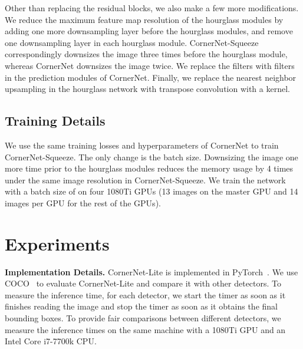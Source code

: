 \documentclass{bmvc2k}
\begin{document}
Other than replacing the residual blocks, we also make a few more modifications. We reduce the maximum feature map resolution of the hourglass modules by adding one more downsampling layer before the hourglass modules, and remove one downsampling layer in each hourglass module. CornerNet-Squeeze correspondingly downsizes the image three times before the hourglass module, whereas CornerNet downsizes the image twice. We replace the  filters with  filters in the prediction modules of CornerNet. Finally, we replace the nearest neighbor upsampling in the hourglass network with transpose convolution with a  kernel.

\subsection{Training Details}
\label{sec:cornernet_squeeze_details}
We use the same training losses and hyperparameters of CornerNet to train CornerNet-Squeeze. The only change is the batch size. Downsizing the image one more time prior to the hourglass modules reduces the memory usage by 4 times under the same image resolution in CornerNet-Squeeze. We train the network with a batch size of  on four 1080Ti GPUs (13 images on the master GPU and 14 images per GPU for the rest of the GPUs).

\section{Experiments}
\smallskip \noindent \textbf{Implementation Details.} CornerNet-Lite is implemented in PyTorch~\cite{paszke2017automatic}. We use COCO~\cite{lin2014microsoft} to evaluate CornerNet-Lite and compare it with other detectors. To measure the inference time, for each detector, we start the timer as soon as it finishes reading the image and stop the timer as soon as it obtains the final bounding boxes. To provide fair comparisons between different detectors, we measure the inference times on the same machine with a 1080Ti GPU and an Intel Core i7-7700k CPU.

\begin{table}[h]
    \centering
    \caption{CornerNet-Saccade saves more than 60\% GPU memory and requires only 4 GPUs to train, while it outperforms CornerNet.}
    \label{tab:training_efficiency}
    \vspace{-3mm}
\end{table}
\end{document}
